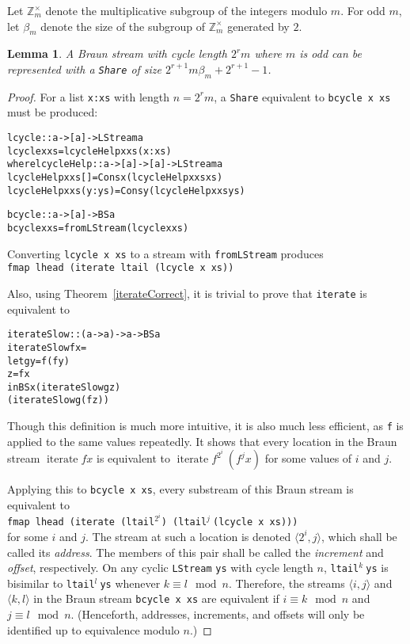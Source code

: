 \documentclass[envcountsect]{llncs}
\DeclareMathOperator{\iter}{iterate}
\newcommand{\share}{{\tt Share} }
\newtheorem{lemma}[theorem]{Lemma}
\begin{document}
Let $\mathbb{Z}_m^{\times}$ denote the multiplicative subgroup of the integers modulo $m$.
For odd $m$, let $\beta_m$ denote the size of the subgroup of $\mathbb{Z}_m^{\times}$ generated by $2$.
\begin{lemma}
\label{cycleSize}
A Braun stream with cycle length $2^r m$ where $m$ is odd can be represented with a \share of size $2^{r+1} m \beta_m + 2^{r+1} - 1$.
\end{lemma}
\begin{proof}
For a list {\tt x:xs} with length $n = 2^r m$, a \share equivalent to {\tt bcycle x xs} must be produced:

\begin{alltt}
lcycle :: a -> [a] -> LStream a
lcycle x xs = lcycleHelp x xs (x:xs)
  where lcycleHelp :: a -> [a] -> [a] -> LStream a
        lcycleHelp x xs []     = Cons x (lcycleHelp x xs xs)
        lcycleHelp x xs (y:ys) = Cons y (lcycleHelp x xs ys)

bcycle :: a -> [a] -> BS a
bcycle x xs = fromLStream (lcycle x xs)
\end{alltt}

Converting {\tt lcycle x xs} to a stream with {\tt fromLStream} produces 
\\
{\tt fmap lhead (iterate ltail (lcycle x xs))}

Also, using Theorem~\ref{iterateCorrect}, it is trivial to prove that {\tt iterate} is equivalent to

\begin{alltt}
iterateSlow :: (a -> a) -> a -> BS a
iterateSlow f x =
  let g y = f (f y)
      z = f x
  in BS x (iterateSlow g    z) 
          (iterateSlow g (f z))
\end{alltt}

Though this definition is much more intuitive, it is also much less efficient, as {\tt f} is applied to the same values repeatedly.
It shows that every location in the Braun stream $\iter f x$ is equivalent to $\iter f^{2^i}\ (f^j x)$ for some values of $i$ and $j$.

Applying this to {\tt bcycle x xs}, every substream of this Braun stream is equivalent to 
\\
{\tt fmap lhead (iterate (ltail}$^{2^i}${\tt ) (ltail}$^j\ ${\tt (lcycle x xs)))} 
\\
for some $i$ and $j$.
The stream at such a location is denoted $\langle 2^i,j \rangle$, which shall be called its {\em address}.
The members of this pair shall be called the {\em increment} and {\em offset}, respectively.
On any cyclic {\tt LStream} {\tt ys} with cycle length $n$, {\tt ltail}$^k\ ${\tt ys} is bisimilar to {\tt ltail}$^l\ ${\tt ys} whenever $k \equiv l \mod n$.
Therefore, the streams $\langle i,j \rangle$ and $\langle k,l \rangle$ in the Braun stream {\tt bcycle x xs} are equivalent if $i \equiv k \mod n$ and $j \equiv l \mod n$.
(Henceforth, addresses, increments, and offsets will only be identified up to equivalence modulo $n$.)



\end{proof}
\end{document}
